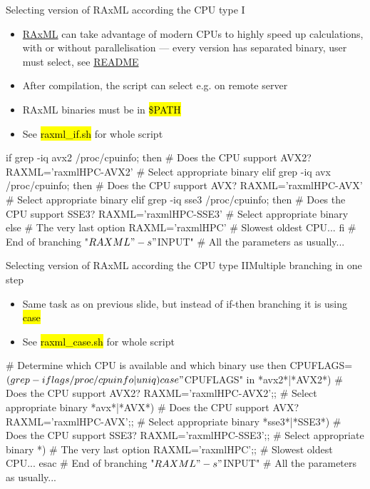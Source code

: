 \documentclass[compress, ucs, xelatex, 11pt, xcolor=svgnames, aspectratio=169,
	hyperref={
		bookmarks=true,
		unicode=true,
		colorlinks=true,
		pdftitle={Linux, command line and MetaCentrum},
		plainpages=false,
		pdfauthor={Vojtech Zeisek},
		pdfsubject={Course about use of Linux command line, writing shell scripts and using MetaCentrum of CESNET},
		pdfcreator={XeLaTeX},
		pdfkeywords={Linux, GNU, BASH, shell, command line, MetaCentrum},
		linkcolor=DarkRed, %
		anchorcolor=DarkBlue, %
		citecolor=Indigo, %
		filecolor=NavyBlue, %
		menucolor=DarkMagenta, %
		urlcolor=DarkBlue, %
		pdftex},
	url={hyphens, lowtilde} %
	]{beamer}
\renewcommand{\texttt}[1]{\hl{\ttfamily #1}}
\begin{document}
\begin{frame}[fragile]{Selecting version of RAxML according the CPU type I}
	\begin{itemize}
		\item \href{https://github.com/stamatak/standard-RAxML}{RAxML} can take advantage of modern CPUs to highly speed up calculations, with or without parallelisation --- every version has separated binary, user must select, see \href{https://github.com/stamatak/standard-RAxML/blob/master/README}{README}
		\item After compilation, the script can select e.g. on remote server
		\item RAxML binaries must be in \texttt{\$PATH}
		\item See \texttt{raxml\_if.sh} for whole script
	\end{itemize}
	\vfill
	\begin{bashcode}
    if grep -iq avx2 /proc/cpuinfo; then # Does the CPU support AVX2?
      RAXML='raxmlHPC-AVX2' # Select appropriate binary
      elif grep -iq avx /proc/cpuinfo; then # Does the CPU support AVX?
        RAXML='raxmlHPC-AVX' # Select appropriate binary
        elif grep -iq sse3 /proc/cpuinfo; then # Does the CPU support SSE3?
          RAXML='raxmlHPC-SSE3' # Select appropriate binary
          else # The very last option
            RAXML='raxmlHPC' # Slowest oldest CPU...
      fi # End of branching
    "$RAXML" -s "$INPUT" # All the parameters as usually...
	\end{bashcode}
\end{frame}

\begin{frame}[fragile]{Selecting version of RAxML according the CPU type II}{Multiple branching in one step}
	\begin{itemize}
		\item Same task as on previous slide, but instead of if-then branching it is using \texttt{case}
		\item See \texttt{raxml\_case.sh} for whole script
	\end{itemize}
	\vfill
	\begin{bashcode}
    # Determine which CPU is available and which binary use then
    CPUFLAGS=$(grep -i flags /proc/cpuinfo | uniq)
    case "$CPUFLAGS" in
      *avx2*|*AVX2*) # Does the CPU support AVX2?
        RAXML='raxmlHPC-AVX2';; # Select appropriate binary
      *avx*|*AVX*) # Does the CPU support AVX?
        RAXML='raxmlHPC-AVX';; # Select appropriate binary
      *sse3*|*SSE3*) # Does the CPU support SSE3?
        RAXML='raxmlHPC-SSE3';; # Select appropriate binary
      *) # The very last option
        RAXML='raxmlHPC';; # Slowest oldest CPU...
      esac # End of branching
    "$RAXML" -s "$INPUT" # All the parameters as usually...
	\end{bashcode}
\end{frame}
\end{document}
